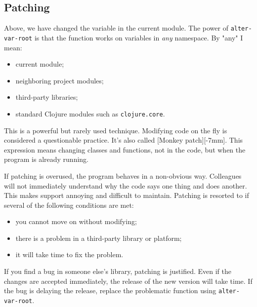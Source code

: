 \subsection{Patching}


Above, we have changed the variable in the current module.
The power of \verb|alter-var-root| is that the function works on variables in \emph{any} namespace. By "any" I mean:

\begin{itemize}

\item
  current module;

\item
  neighboring project modules;

\item
  third-party libraries;

\item
  standard Clojure modules such as \texttt{clo\-ju\-re.co\-re}.

\end{itemize}


This is a powerful but rarely used technique.
Modifying code on the fly is considered a questionable practice.
It's also called [Monkey patch][-7mm]. This expression means changing classes and functions, not in the code, but when the program is already running.

If patching is overused, the program behaves in a non-obvious way.
Colleagues will not immediately understand why the code says one thing and does another.
This makes support annoying and difficult to maintain. Patching is resorted to if several of the following conditions are met:

\begin{itemize}

\item
  you cannot move on without modifying;

\item
  there is a problem in a third-party library or platform;

\item
  it will take time to fix the problem.

\end{itemize}

If you find a bug in someone else's library, patching is justified.
Even if the changes are accepted immediately, the release of the new version will take time.
If the bug is delaying the release, replace the problematic function using \verb|alter-var-root|.

